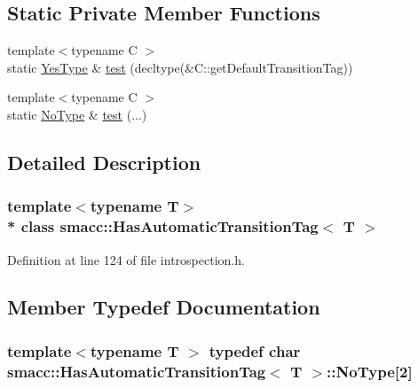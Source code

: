 \subsection*{Static Private Member Functions}
\begin{DoxyCompactItemize}
\item 
{\footnotesize template$<$typename C $>$ }\\static \hyperlink{classsmacc_1_1HasAutomaticTransitionTag_ad3b0dca13c15ca18d97bbfa0f613614c}{Yes\+Type} \& \hyperlink{classsmacc_1_1HasAutomaticTransitionTag_ad6935748633315a97a51f5ce73712b17}{test} (decltype(\&C\+::get\+Default\+Transition\+Tag))
\item 
{\footnotesize template$<$typename C $>$ }\\static \hyperlink{classsmacc_1_1HasAutomaticTransitionTag_adf9d68b94f123045a71e9a8ee31a5aa6}{No\+Type} \& \hyperlink{classsmacc_1_1HasAutomaticTransitionTag_af219b2c85ec6b7dad6862375d7c02ce8}{test} (...)
\end{DoxyCompactItemize}


\subsection{Detailed Description}
\subsubsection*{template$<$typename T$>$\\*
class smacc\+::\+Has\+Automatic\+Transition\+Tag$<$ T $>$}



Definition at line 124 of file introspection.\+h.



\subsection{Member Typedef Documentation}
\subsubsection[{\texorpdfstring{No\+Type}{NoType}}]{\setlength{\rightskip}{0pt plus 5cm}template$<$typename T $>$ typedef char {\bf smacc\+::\+Has\+Automatic\+Transition\+Tag}$<$ T $>$\+::No\+Type\mbox{[}2\mbox{]}\hspace{0.3cm}{\ttfamily [private]}}\hypertarget{classsmacc_1_1HasAutomaticTransitionTag_adf9d68b94f123045a71e9a8ee31a5aa6}{}\label{classsmacc_1_1HasAutomaticTransitionTag_adf9d68b94f123045a71e9a8ee31a5aa6}


